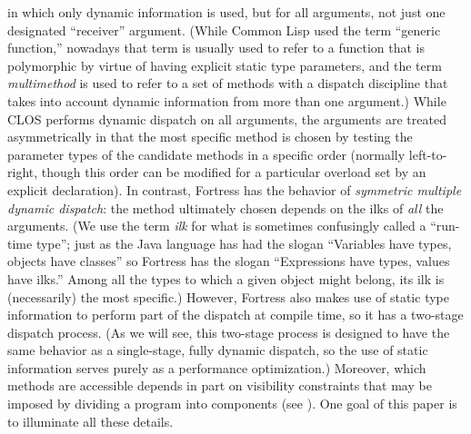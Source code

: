 in which only dynamic information is used, but for all arguments,
not just one designated ``receiver'' argument.
(While Common Lisp used the term ``generic function,'' nowadays
that term is usually used to refer to a function that is polymorphic
by virtue of having explicit static type parameters, and
the term \emph{multimethod} is used to refer to a set of methods
with a dispatch discipline that takes into account dynamic information
from more than one argument.)
While CLOS performs dynamic dispatch on all arguments,
the arguments are treated asymmetrically in that the most specific
method is chosen by testing the parameter types of the candidate
methods in a specific order (normally left-to-right, though this order
can be modified for a particular overload set by an explicit declaration).
In contrast, Fortress has the behavior of \emph{symmetric multiple dynamic dispatch}:
the method ultimately chosen depends on the ilks of \emph{all} the arguments.
(We use the term \emph{ilk} for what is sometimes confusingly called a ``run-time type'';
just as the Java language has had the slogan ``Variables have types, objects have classes'' \cite[\S 4.5.5]{JLS1}
so Fortress has the slogan ``Expressions have types, values have ilks.''
Among all the types to which a given object might belong, its ilk
is (necessarily) the most specific.)
However, Fortress also makes use of static type information to perform part of the
dispatch at compile time, so it has a two-stage dispatch process.
(As we will see, this two-stage process is designed to have
the same behavior as a single-stage, fully dynamic dispatch,
so the use of static information serves purely as a performance optimization.)
Moreover, which methods are accessible depends in part
on visibility constraints that may be imposed by dividing a program
into components (see ).
One goal of this paper is to illuminate all these details.

